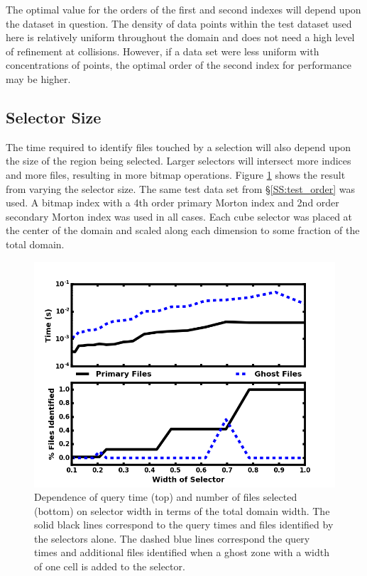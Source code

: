 \documentclass[apjl]{emulateapj}
\begin{document}
The optimal value for the orders of the first and second indexes will depend upon the dataset in question. The density of data points within the test dataset used here is relatively uniform throughout the domain and does not need a high level of refinement at collisions. However, if a data set were less uniform with concentrations of points, the optimal order of the second index for performance may be higher.

\subsection{Selector Size}\label{SS:test_size}
%
The time required to identify files touched by a selection will also depend upon the size of the region being selected. Larger selectors will intersect more indices and more files, resulting in more bitmap operations. Figure \ref{fig:test_size} shows the result from varying the selector size. The same test data set from \S\ref{SS:test_order} was used. A bitmap index with a 4th order primary Morton index and 2nd order secondary Morton index was used in all cases. Each cube selector was placed at the center of the domain and scaled along each dimension to some fraction of the total domain.
%
\ifinclfig
	\begin{figure}[htbp]
	\begin{center}
	\includegraphics[width=\columnwidth,keepaspectratio]{../images/vary_selector.png}
	\caption{Dependence of query time (top) and number of files selected (bottom) on selector width in terms of the total domain width. The solid black lines correspond to the query times and files identified by the selectors alone. The dashed blue lines correspond the query times and additional files identified when a ghost zone with a width of one cell is added to the selector.}
	\label{fig:test_size}
	\end{center}
	\end{figure}
\fi
%
\end{document}

